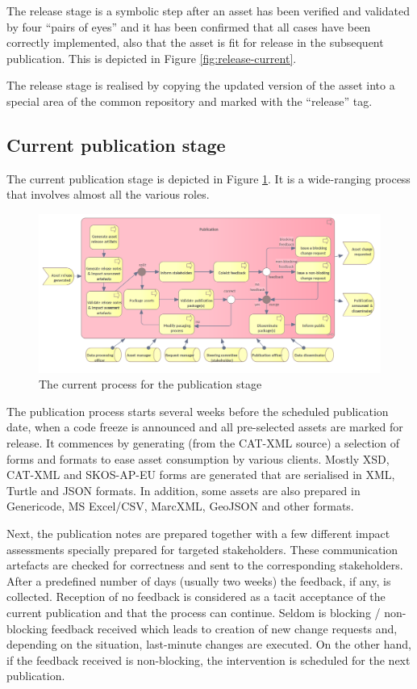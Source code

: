 	The release stage is a symbolic step after an asset has been verified and validated by four ``pairs of eyes'' and it has been confirmed that all cases have been correctly implemented, also that the asset is fit for release in the subsequent publication. This is depicted in Figure \ref{fig:release-current}.

	The release stage is realised by copying the updated version of the asset into a special area of the common repository and marked with the ``release'' tag.

	\subsection{Current publication stage}
	
	The current publication stage is depicted in Figure \ref{fig:publication-current}. It is a wide-ranging process that involves almost all the various roles. 
	
	\label{sec:publication-current}
		\begin{figure}[h]
		\centering
		\includegraphics[width=1.03\textwidth]{images/business/current/Publication.png}
		\caption{The current process for the publication stage}
		\label{fig:publication-current}
	\end{figure}

	The publication process starts several weeks before the scheduled publication date, when a code freeze is announced and all pre-selected assets are marked for release. It commences by generating (from the CAT-XML source) a selection of forms and formats to ease asset consumption by various clients. Mostly XSD, CAT-XML and SKOS-AP-EU forms are generated that are serialised in XML, Turtle and JSON formats. In addition, some assets are also prepared in Genericode, MS Excel/CSV, MarcXML, GeoJSON and other formats. 
	
	Next, the publication notes are prepared together with a few different impact assessments specially prepared for targeted stakeholders. These communication artefacts are checked for correctness and sent to the corresponding stakeholders. After a predefined number of days (usually two weeks) the feedback, if any, is collected. Reception of no feedback is considered as a tacit acceptance of the current publication and that the process can continue. Seldom is blocking / non-blocking feedback received which leads to creation of new change requests and, depending on the situation, last-minute changes are executed. On the other hand, if the feedback received is non-blocking, the intervention is scheduled for the next publication. 
	
